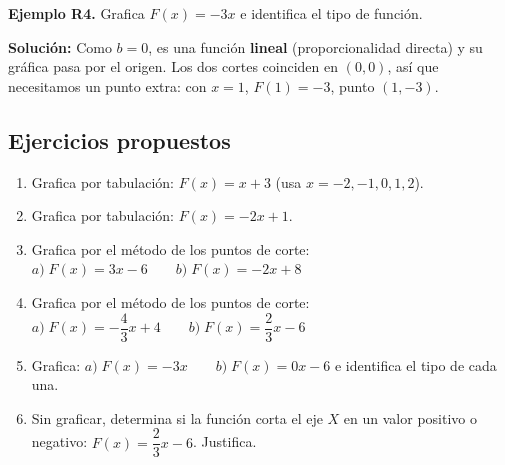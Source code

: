 \documentclass[12pt, letterpaper]{article}
\begin{document}
\textbf{Ejemplo R4.} Grafica $F(x) = -3x$ e identifica el tipo de función.

\begin{cuadrosolucion}
  \textbf{Solución:} Como $b = 0$, es una función \textbf{lineal} (proporcionalidad directa) y su gráfica pasa por el origen. Los dos cortes coinciden en $(0, 0)$, así que necesitamos un punto extra: con $x = 1$, $F(1) = -3$, punto $(1, -3)$.
  \begin{center}
  \end{center}
\end{cuadrosolucion}

\subsection{Ejercicios propuestos}

\begin{enumerate}[leftmargin=*, resume]
  \item \facil{} Grafica por tabulación: $F(x) = x + 3$ (usa $x = -2, -1, 0, 1, 2$).

  \item \facil{} Grafica por tabulación: $F(x) = -2x + 1$.

  \item \medio{} Grafica por el método de los puntos de corte: $a) \; F(x) = 3x - 6 \qquad b) \; F(x) = -2x + 8$

  \item \medio{} Grafica por el método de los puntos de corte: $a) \; F(x) = -\dfrac{4}{3}x + 4 \qquad b) \; F(x) = \dfrac{2}{3}x - 6$

  \item \medio{} Grafica: $a) \; F(x) = -3x \qquad b) \; F(x) = 0x - 6$ e identifica el tipo de cada una.

  \item \dificil{} Sin graficar, determina si la función corta el eje $X$ en un valor positivo o negativo: $F(x) = \dfrac{2}{3}x - 6$. Justifica.
\end{enumerate}
\end{document}
